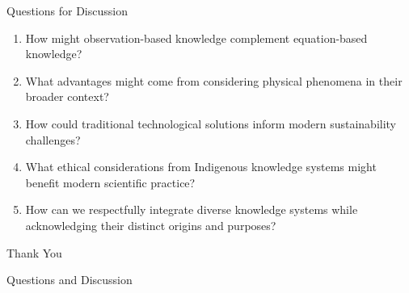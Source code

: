 \documentclass{beamer}
\begin{document}
\begin{frame}{Questions for Discussion}
    \begin{enumerate}
        \item How might observation-based knowledge complement equation-based knowledge?
        \item What advantages might come from considering physical phenomena in their broader context?
        \item How could traditional technological solutions inform modern sustainability challenges?
        \item What ethical considerations from Indigenous knowledge systems might benefit modern scientific practice?
        \item How can we respectfully integrate diverse knowledge systems while acknowledging their distinct origins and purposes?
    \end{enumerate}
\end{frame}

\begin{frame}
    \begin{center}
        \Huge\textcolor{ds9blue}{Thank You}
        
        \vspace{1cm}
        
        \large Questions and Discussion
    \end{center}
\end{frame}
\end{document}
